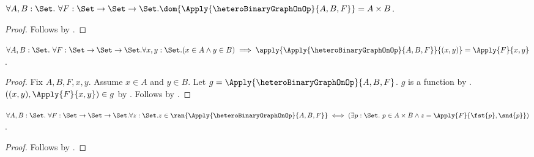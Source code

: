 \begin{proposition}\label{logical_heterogeneous_binary_graph_on_dom}
    $\forall A,B:\Set.\ \forall F:\Set\to\Set\to\Set.
        \dom{\Apply{\heteroBinaryGraphOnOp}{A,B,F}}
            =A\times B$.
\end{proposition}
\begin{proof}
    Follows by
        .
\end{proof}

\begin{proposition}\label{logical_heterogeneous_binary_graph_on_apply}
    $\forall A,B:\Set.\ \forall F:\Set\to\Set\to\Set.
     \forall x,y:\Set.
        (x\in A\land y\in B)
        \implies
        \apply{\Apply{\heteroBinaryGraphOnOp}{A,B,F}}
            {(x,y)}
        =\Apply{F}{x,y}$.
\end{proposition}
\begin{proof}
    Fix $A,B,F,x,y$.
    Assume $x\in A$ and $y\in B$.
    Let $g=\Apply{\heteroBinaryGraphOnOp}{A,B,F}$.
    $g$ is a function by
        .
    $((x,y),\Apply{F}{x,y})\in g$ by
        .
    Follows by .
\end{proof}

\begin{proposition}\label{logical_heterogeneous_binary_graph_on_range}
    $\forall A,B:\Set.\ \forall F:\Set\to\Set\to\Set.
     \forall z:\Set.
        z\in\ran{
            \Apply{\heteroBinaryGraphOnOp}{A,B,F}}
        \iff
        (\exists p:\Set.\ p\in A\times B\land
            z=\Apply{F}{\fst{p},\snd{p}})$.
\end{proposition}
\begin{proof}
    Follows by
        .
\end{proof}

